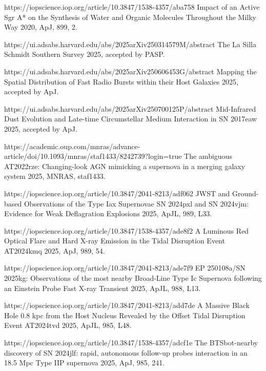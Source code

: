 \begin{cvpubs}
\begin{cvpubitems}
{}
{https://iopscience.iop.org/article/10.3847/1538-4357/aba758}
{Impact of an Active Sgr A* on the Synthesis of Water and Organic Molecules Throughout the Milky Way}
{2020, ApJ, 899, 2.}


{\Cliu}
{https://ui.adsabs.harvard.edu/abs/2025arXiv250314579M/abstract}
{The La Silla Schmidt Southern Survey}
{2025, accepted by PASP.}

{\Cliu}
{https://ui.adsabs.harvard.edu/abs/2025arXiv250606453G/abstract}
{Mapping the Spatial Distribution of Fast Radio Bursts within their Host Galaxies}
{2025, accepted by ApJ.}

{\Cliu}
{https://ui.adsabs.harvard.edu/abs/2025arXiv250700125P/abstract}
{Mid-Infrared Dust Evolution and Late-time Circumstellar Medium Interaction in SN 2017eaw}
{2025, accepted by ApJ.}

{\Cliu}
{https://academic.oup.com/mnras/advance-article/doi/10.1093/mnras/staf1433/8242739?login=true}
{The ambiguous AT2022rze: Changing-look AGN mimicking a supernova in a merging galaxy system}
{2025, MNRAS, staf1433.}

{\Cliu}
{https://iopscience.iop.org/article/10.3847/2041-8213/adf062}
{JWST and Ground-based Observations of the Type Iax Supernovae SN 2024pxl and SN 2024vjm: Evidence for Weak Deflagration Explosions}
{2025, ApJL, 989, L33.}

{\Cliu}
{https://iopscience.iop.org/article/10.3847/1538-4357/ade8f2}
{A Luminous Red Optical Flare and Hard X-ray Emission in the Tidal Disruption Event AT2024kmq}
{2025, ApJ, 989, 54.}

{\Cliu}
{https://iopscience.iop.org/article/10.3847/2041-8213/ade7f9}
{EP 250108a/SN 2025kg: Observations of the most nearby Broad-Line Type Ic Supernova following an Einstein Probe Fast X-ray Transient}
{2025, ApJL, 988, L13.}

{\Cliu}
{https://iopscience.iop.org/article/10.3847/2041-8213/add7de}
{A Massive Black Hole 0.8 kpc from the Host Nucleus Revealed by the Offset Tidal Disruption Event AT2024tvd}
{2025, ApJL, 985, L48.}

{\Cliu}
{https://iopscience.iop.org/article/10.3847/1538-4357/adcf1e}
{The BTSbot-nearby discovery of SN 2024jlf: rapid, autonomous follow-up probes interaction in an 18.5 Mpc Type IIP supernova}
{2025, ApJ, 985, 241.}


\end{cvpubitems}
\end{cvpubs}
